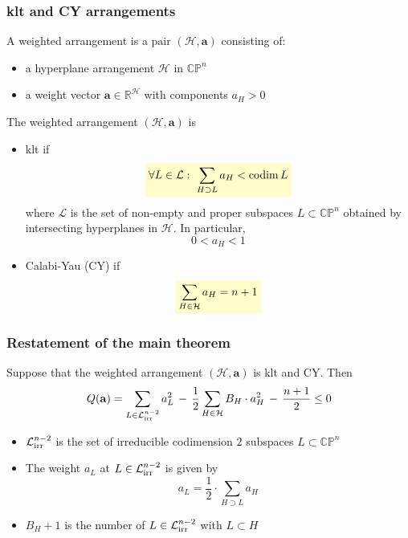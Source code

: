 \documentclass{beamer}
\newcommand{\R}{\mathbb{R}}
\newcommand{\CP}{\mathbb{CP}}
\newcommand{\mH}{\mathcal{H}}
\newcommand{\mL}{\mathcal{L}}
\newcommand{\ba}{\mathbf{a}}
\newcommand{\mLi}{\mathcal{L}_{\textup{irr}}}
\DeclareMathOperator{\codim}{codim}
\newcommand{\mathcolorbox}[2]{\colorbox{#1}{$\displaystyle #2$}}
\begin{document}
\begin{frame}
	\frametitle{klt and CY arrangements}
	A weighted arrangement is a pair \((\mH, \ba)\) consisting of:
	\begin{itemize}
		\item a hyperplane arrangement \(\mH\) in \(\CP^n\)
		\item a weight vector \(\ba \in \R^{\mH}\) with components \(a_H > 0\)
	\end{itemize}
	
	
	
	\pause
	The weighted arrangement \((\mH, \ba)\) is
	\begin{itemize}
		\item  klt if
		\[
		\mathcolorbox{yellow!20}{
	\forall L \in \mL: \,\, \sum_{H \supset L} a_H < \codim L 	
	}
		\] 
		where \(\mL\) is the set of non-empty and proper subspaces \(L \subset \CP^n\) obtained by intersecting hyperplanes in \(\mH\).
		In particular, 
		\[0 < a_H < 1 \]
		\pause
		\item  Calabi-Yau (CY) if
		\[
		\mathcolorbox{yellow!20}{
			\sum_{H \in \mH} a_H = n+1 	
		}
		\] 
	\end{itemize}
\end{frame}


\begin{frame}
	\frametitle{Restatement of the main theorem}
	\begin{theorem}
		Suppose that the weighted arrangement \((\mH, \ba)\) is klt and CY. Then
		\[
		Q(\ba) = \sum_{L \in \mLi^{n-2}} a_L^2 \,-\, \frac{1}{2} \sum_{H \in \mH} B_H \cdot a_H^2 \,-\, \frac{n+1}{2} \leq 0 
		\]
	\end{theorem}
\begin{itemize}
	\pause
	\item \(\mLi^{n-2}\) is the set of irreducible codimension \(2\) subspaces \(L \subset \CP^n\)
	\pause
	\item The weight \(a_L\) at \(L \in \mLi^{n-2}\) is given by
	\[
	a_L = \frac{1}{2} \cdot \sum_{H \supset L} a_H
	\]
	\pause
	\item \(B_H + 1\) is the number of \(L \in \mLi^{n-2}\) with \(L \subset H\)
\end{itemize}
\end{frame}
\end{document}
